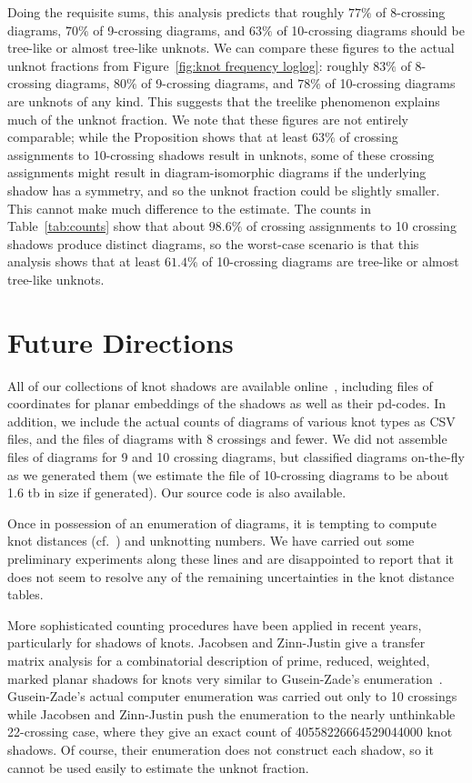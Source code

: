 \documentclass[amsmath,secnumarabic,amssymb,floatfix,nofootinbib,nobibnotes,letterpaper,11pt,tightenlines,showkeys]{revtex4}
\theoremstyle{definition}
\begin{document}
Doing the requisite sums, this analysis predicts that roughly $77\%$ of 8-crossing diagrams, $70\%$ of 9-crossing diagrams, and $63\%$ of 10-crossing diagrams should be tree-like or almost tree-like unknots. We can compare these figures to the actual unknot fractions from Figure~\ref{fig:knot frequency loglog}: roughly $83\%$ of 8-crossing diagrams, $80\%$ of 9-crossing diagrams, and $78\%$ of 10-crossing diagrams are unknots of any kind. This suggests that the treelike phenomenon explains much of the unknot fraction. We note that these figures are not entirely comparable; while the Proposition shows that at least $63\%$ of crossing assignments to 10-crossing shadows result in unknots, some of these crossing assignments might result in diagram-isomorphic diagrams if the underlying shadow has a symmetry, and so the unknot fraction could be slightly smaller. This cannot make much difference to the estimate. The counts in Table~\ref{tab:counts} show that about $98.6\%$ of crossing assignments to 10 crossing shadows produce distinct diagrams, so the worst-case scenario is that this analysis shows that at least $61.4\%$ of 10-crossing diagrams are tree-like or almost tree-like unknots.

\section{Future Directions}

All of our collections of knot shadows are available online~\cite{suppdata}, including files of coordinates for planar embeddings of the shadows as well as their pd-codes. In addition, we include the actual counts of diagrams of various knot types as CSV files, and the files of diagrams with 8 crossings and fewer. We did not assemble files of diagrams for 9 and 10 crossing diagrams, but classified diagrams on-the-fly as we generated them (we estimate the file of 10-crossing diagrams to be about 1.6 tb in size if generated). Our source code is also available.

Once in possession of an enumeration of diagrams, it is tempting to compute knot distances (cf.~\cite{DARCY:2001fi,MoonHyeyoung:2010tm}) and unknotting numbers. We have carried out some preliminary experiments along these lines and are disappointed to report that it does not seem to resolve any of the remaining uncertainties in the knot distance tables.

More sophisticated counting procedures have been applied in recent years, particularly for shadows of knots. Jacobsen and Zinn-Justin\cite{Jacobsen:2002kia} give a transfer matrix analysis for a combinatorial description of prime, reduced, weighted, marked planar shadows for knots very similar to Gusein-Zade's enumeration~\cite{GusenZade:1994wl,GusenZade:1998jz}. Gusein-Zade's actual computer enumeration was carried out only to 10 crossings while Jacobsen and Zinn-Justin push the enumeration to the nearly unthinkable 22-crossing case, where they give an exact count of 40558226664529044000 knot shadows. Of course, their enumeration does not construct each shadow, so it cannot be used easily to estimate the unknot fraction.
\end{document}
